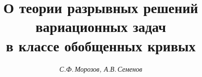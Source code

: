 









\newcommand{\sign}{\operatorname{sign}}


\newcommand{\supp}{\operatorname{supp}}


\newcommand{\tts}[1]{}







\setcounter{page}{48}















\author{\it С.Ф.\,Морозов, А.В.\,Семенов}




\title{О теории разрывных решений вариационных задач\\


в классе обобщенных кривых}





\date{}




\pagestyle{plain} %







\maketitle


